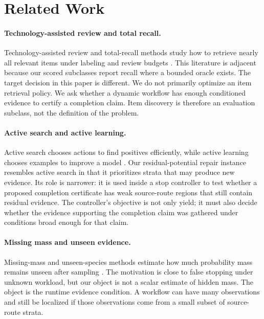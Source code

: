 \documentclass[letterpaper,10pt,twocolumn]{article}
\begin{document}
\section{Related Work}

\paragraph{Technology-assisted review and total recall.}
Technology-assisted review and total-recall methods study how to retrieve nearly
all relevant items under labeling and review budgets
\citep{grossman2011technology,cormack2014evaluation,cormack2016engineering}.
This literature is adjacent because our scored subclasses report recall where a
bounded oracle exists. The target decision in this paper is different. We do not
primarily optimize an item retrieval policy. We ask whether a dynamic workflow
has enough conditioned evidence to certify a completion claim. Item discovery is
therefore an evaluation subclass, not the definition of the problem.

\paragraph{Active search and active learning.}
Active search chooses actions to find positives efficiently, while active
learning chooses examples to improve a model
\citep{lewis1994sequential,settles2009active,garnett2012bayesian}. Our
residual-potential repair instance resembles active search in that it prioritizes
strata that may produce new evidence. Its role is narrower: it is used inside a
stop controller to test whether a proposed completion certificate has weak
source-route regions that still contain residual evidence. The controller's
objective is not only yield; it must also decide whether the evidence supporting
the completion claim was gathered under conditions broad enough for that claim.

\paragraph{Missing mass and unseen evidence.}
Missing-mass and unseen-species methods estimate how much probability mass
remains unseen after sampling \citep{good1953population,chao1984nonparametric}.
The motivation is close to false stopping under unknown workload, but our object
is not a scalar estimate of hidden mass. The object is the runtime evidence
condition. A workflow can have many observations and still be localized if those
observations come from a small subset of source-route strata.
\end{document}
